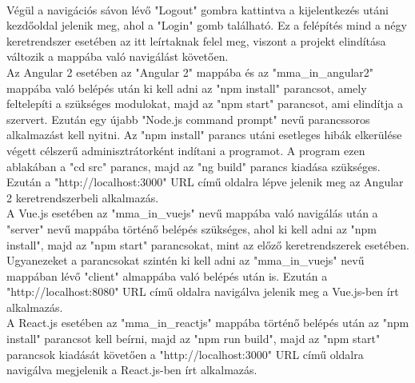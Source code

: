 \\Végül a navigációs sávon lévő "Logout" gombra kattintva a kijelentkezés utáni kezdőoldal jelenik meg, ahol a "Login" gomb található.
Ez a felépítés mind a négy keretrendszer esetében az itt leírtaknak felel meg, viszont a projekt elindítása változik a mappába való navigálást követően.
\\

Az Angular 2 esetében az "Angular 2" mappába és az "mma\_in\_angular2" mappába való belépés után ki kell adni az "npm install" parancsot, amely feltelepíti a szükséges modulokat, majd az "npm start" parancsot, ami elindítja a szervert. Ezután egy újabb "Node.js command prompt" nevű parancssoros alkalmazást kell nyitni. Az "npm install" parancs utáni esetleges hibák elkerülése végett célszerű adminisztrátorként indítani a programot. A program ezen ablakában a "cd src" parancs, majd az "ng build" parancs kiadása szükséges. Ezután a "http://localhost:3000" URL című oldalra lépve jelenik meg az Angular 2 keretrendszerbeli alkalmazás. \\

A Vue.js esetében az "mma\_in\_vuejs" nevű mappába való navigálás után a "server" nevű mappába történő belépés szükséges, ahol ki kell adni az "npm install", majd az "npm start" parancsokat, mint az előző keretrendszerek esetében. Ugyanezeket a parancsokat szintén ki kell adni az "mma\_in\_vuejs" nevű mappában lévő "client" almappába való belépés után is. Ezután a "http://localhost:8080" URL című oldalra navigálva jelenik meg a Vue.js-ben írt alkalmazás.\\

A React.js esetében az "mma\_in\_reactjs" mappába történő belépés után az "npm install" parancsot kell beírni, majd az "npm run build", majd az "npm start" parancsok kiadását követően a "http://localhost:3000" URL című oldalra navigálva megjelenik a React.js-ben írt alkalmazás.


